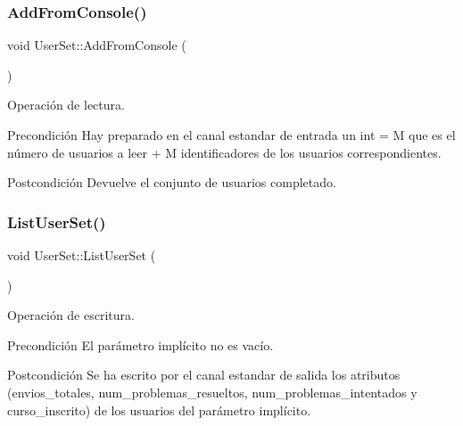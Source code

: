 \subsubsection{\texorpdfstring{Add\+From\+Console()}{AddFromConsole()}}
{\footnotesize\ttfamily void User\+Set\+::\+Add\+From\+Console (\begin{DoxyParamCaption}{ }\end{DoxyParamCaption})}



Operación de lectura. 

\begin{DoxyPrecond}{Precondición}
Hay preparado en el canal estandar de entrada un int = M que es el número de usuarios a leer + M identificadores de los usuarios correspondientes. 
\end{DoxyPrecond}
\begin{DoxyPostcond}{Postcondición}
Devuelve el conjunto de usuarios completado. 
\end{DoxyPostcond}
\mbox{\label{class_user_set_a0d096b2eec4c9b5feb4a1d7c8e6d3ef6}} 
\subsubsection{\texorpdfstring{List\+User\+Set()}{ListUserSet()}}
{\footnotesize\ttfamily void User\+Set\+::\+List\+User\+Set (\begin{DoxyParamCaption}{ }\end{DoxyParamCaption})}



Operación de escritura. 

\begin{DoxyPrecond}{Precondición}
El parámetro implícito no es vacío. 
\end{DoxyPrecond}
\begin{DoxyPostcond}{Postcondición}
Se ha escrito por el canal estandar de salida los atributos (envios\+\_\+totales, num\+\_\+problemas\+\_\+resueltos, num\+\_\+problemas\+\_\+intentados y curso\+\_\+inscrito) de los usuarios del parámetro implícito. 
\end{DoxyPostcond}
\mbox{\label{class_user_set_a2087d9597ff9ce03ff471157040fac88}} 
